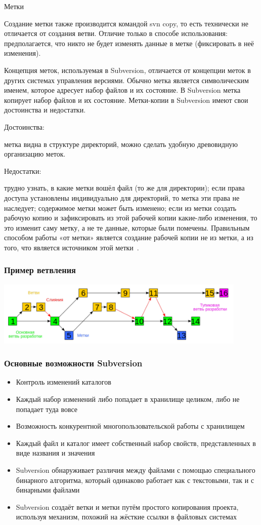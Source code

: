 \documentclass{../industrial-development}
\begin{document}
\lecturenotes

Метки

Создание метки также производится командой svn copy, то есть технически не отличается от создания ветви. Отличие только в способе использования: предполагается, что никто не будет изменять данные в метке (фиксировать в неё изменения).

Концепция меток, используемая в Subversion, отличается от концепции меток в других системах управления версиями. Обычно метка является символическим именем, которое адресует набор файлов и их состояние. В Subversion метка копирует набор файлов и их состояние. Метки-копии в Subversion имеют свои достоинства и недостатки.

Достоинства:

    метка видна в структуре директорий, можно сделать удобную древовидную организацию меток.

Недостатки:

    трудно узнать, в какие метки вошёл файл (то же для директории);
    если права доступа установлены индивидуально для директорий, то метка эти права не наследует;
    содержимое метки может быть изменено;
    если из метки создать рабочую копию и зафиксировать из этой рабочей копии какие-либо изменения, то это изменит саму метку, а не те данные, которые были помечены. Правильным способом работы «от метки» является создание рабочей копии не из метки, а из того, что является источником этой метки~\cite{SVNWikipedia}.


\begin{frame} \frametitle{Пример ветвления}
  \centerline{\includegraphics[width=0.9\textwidth]{branching-svn.pdf}}
\end{frame}

\begin{frame} \frametitle{Основные возможности Subversion}
  
  \begin{itemize}
  \item Контроль изменений каталогов
  \item Каждый набор изменений либо попадает в хранилище целиком, либо не попадает туда вовсе
  \item Возможность конкурентной многопользовательской работы с хранилищем
  \item Каждый файл и каталог имеет собственный набор свойств, представленных в виде названия и значения
  \item Subversion обнаруживает различия между файлами с помощью специального бинарного алгоритма, который одинаково работает как с текстовыми, так и с бинарными файлами
  \item Subversion создаёт ветки и метки путём простого копирования проекта, используя механизм, похожий на жёсткие ссылки в файловых системах
  \end{itemize}
\end{frame}
\end{document}
